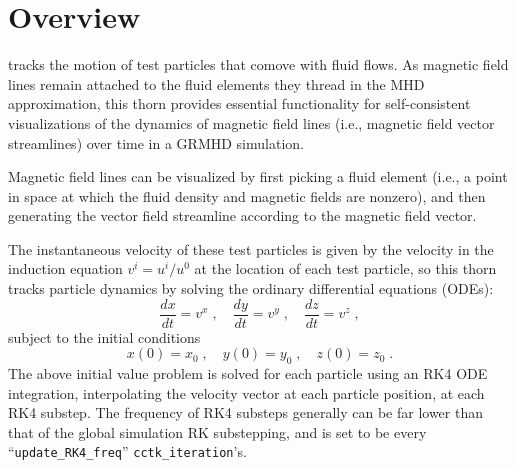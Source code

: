 \linespread{1.0}

\newenvironment{packed_itemize}{
\begin{itemize}
  \setlength{\itemsep}{0.0pt}
  \setlength{\parskip}{0.0pt}
  \setlength{\parsep}{ 0.0pt}
}{\end{itemize}}

\newenvironment{packed_enumerate}{
\begin{enumerate}
  \setlength{\itemsep}{0.0pt}
  \setlength{\parskip}{0.0pt}
  \setlength{\parsep}{ 0.0pt}
}{\end{enumerate}}

\begin{abstract}
  \thornname is used to track the motion of test particles that comove
  with fluid flows. With this data once can generate accurate,
  self-consistent visualizations of magnetic field lines over
  the course of e.g., a binary neutron star simulation.
\end{abstract}

\section{Overview}
\label{sec:overview}

\thornname tracks the motion of test particles that comove with fluid
flows. As magnetic field lines remain attached to the fluid elements
they thread in the MHD approximation, this thorn provides essential
functionality for self-consistent visualizations of the dynamics of
magnetic field lines (i.e., magnetic field vector streamlines) over time
in a GRMHD simulation.

Magnetic field lines can be visualized by first picking a fluid element
(i.e., a point in space at which the fluid density and magnetic fields
are nonzero), and then generating the vector field streamline according
to the magnetic field vector.

The instantaneous velocity of these test particles is given by the
velocity in the induction equation $v^{i} = u^{i}/u^{0}$ at the location
of each test particle, so this thorn tracks particle dynamics by solving
the ordinary differential equations (ODEs):
\begin{equation}
  \frac{dx}{dt} = v^{x}\;,\quad\frac{dy}{dt} = v^{y}\;,\quad\frac{dz}{dt} = v^{z}\;,
\end{equation}
subject to the initial conditions
\begin{equation}
  x(0) = x_{0}\;,\quad y(0) = y_{0}\;,\quad z(0) = z_{0}\;.
\end{equation}
The above initial value problem is solved for each particle using an RK4
ODE integration, interpolating the velocity vector at each particle
position, at each RK4 substep. The frequency of RK4 substeps generally
can be far lower than that of the global simulation RK substepping, and
is set to be every ``\verb|update_RK4_freq|'' \verb|cctk_iteration|'s.

